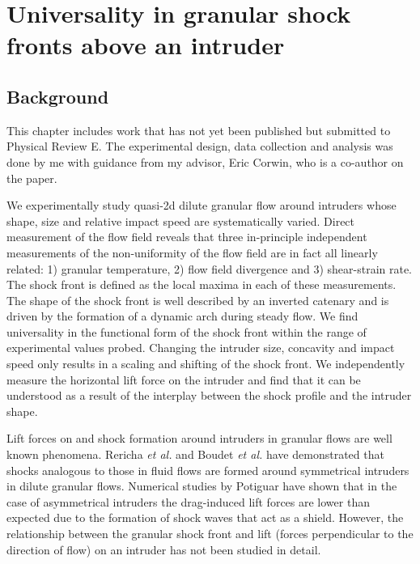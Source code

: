 \chapter{Universality in granular shock fronts above an intruder}
\author{Mohammad Yasinul Karim, Eric I. Corwin}

%

\section{Background}
This chapter includes work that has not yet been published but submitted to Physical Review E. The experimental design, data collection and analysis was done by me with guidance from my advisor, Eric Corwin, who is a co-author on the paper. 

We experimentally study quasi-2d dilute granular flow around intruders whose shape, size and relative impact speed are systematically varied. Direct measurement of the flow field reveals that three in-principle independent measurements of the non-uniformity of the flow field are in fact all linearly related: 1) granular temperature, 2) flow field divergence and 3) shear-strain rate.  The shock front is defined as the local maxima in each of these measurements. The shape of the shock front is well described by an inverted catenary and is driven by the formation of a dynamic arch during steady flow. We find universality in the functional form of the shock front within the range of experimental values probed. Changing the intruder size, concavity and impact speed only results in a scaling and shifting of the shock front. We independently measure the horizontal lift force on the intruder and find that it can be understood as a result of the interplay between the shock profile and the intruder shape.

Lift forces \cite{soller_drag_2006, ding_drag_2011,  potiguar_lift_2011, potiguar_lift_2013} on and shock formation \cite{haff_grain_1983, rericha_shocks_2001, amarouchene_speed_2006} around intruders in granular flows are well known phenomena. Rericha \textit{et al.} \cite{rericha_shocks_2001} and Boudet \textit{et al.}  \cite{boudet_shock_2008,  boudet_drag_2010} have demonstrated that shocks analogous to those in fluid flows are formed around symmetrical intruders in dilute granular flows. Numerical studies by Potiguar \cite{potiguar_lift_2011} have shown that in the case of asymmetrical intruders the drag-induced lift forces are lower than expected due to the formation of shock waves that act as a shield. However, the relationship between the granular shock front and lift (forces perpendicular to the direction of flow) on an intruder has not been studied in detail. 

